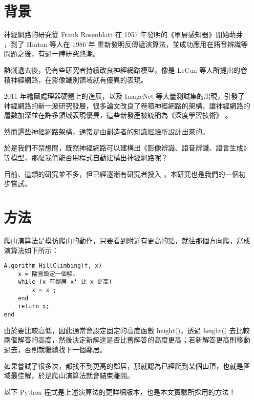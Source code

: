 \documentclass{article}
\begin{document}
\section{背景}

神經網路的研究從 Frank Rosenblatt 在 1957 年發明的《單層感知器》開始萌芽 \cite{Rosenblatt1958ThePA} ，到了 Hinton 等人在 1986 年 \cite{Rumelhart1986LearningRB} 重新發明反傳遞演算法，並成功應用在語音辨識等問題之後，有過一陣研究熱潮。

熱潮退去後，仍有些研究者持續改良神經網路模型，像是 LeCun \cite{LeCun1998GradientbasedLA} 等人所提出的卷積神經網路，在影像識別領域就有優異的表現。

2011 年繪圖處理器硬體上的進展，以及 ImageNet 等大量測試集的出現，引發了神經網路的新一波研究發展，很多論文改良了卷積神經網路的架構，讓神經網路的層數加深並在許多領域表現優異，這些新發產被統稱為《深度學習技術》 \cite{Szegedy2015GoingDW} \cite{Ioffe2015BatchNA} \cite{Chollet2017XceptionDL} 。

然而這些神經網路架構，通常是由創造者的知識經驗所設計出來的。

於是我們不禁想問，既然神經網路可以建構出《影像辨識、語音辨識、語言生成》等模型，那麼我們能否用程式自動建構出神經網路呢？

目前、這類的研究並不多，但已經逐漸有研究者投入 \cite{Mendoza2019TowardsAD} \cite{Abreu2019AutoNN}，本研究也是我們的一個初步嘗試。

\section{方法}

爬山演算法是模仿爬山的動作，只要看到附近有更高的點，就往那個方向爬，寫成演算法如下所示：

\begin{minipage}{\linewidth}
\begin{verbatim}
Algorithm HillClimbing(f, x)
    x = 隨意設定一個解。
    while (x 有鄰居 x' 比 x 更高)
        x = x';
    end
    return x;
end
\end{verbatim}
\end{minipage}

由於要比較高低，因此通常會設定固定的高度函數 height()，透過 height() 去比較兩個解答的高度，然後決定新解達是否比舊解答的高度更高；若新解答更高則移動過去，否則就繼續找下一個鄰居。

如果嘗試了很多次，都找不到更高的鄰居，那就認為已經爬到某個山頂，也就是區域最佳解，於是爬山演算法就會結束離開。

以下 Python 程式是上述演算法的更詳細版本，也是本文實驗所採用的方法！
\end{document}
